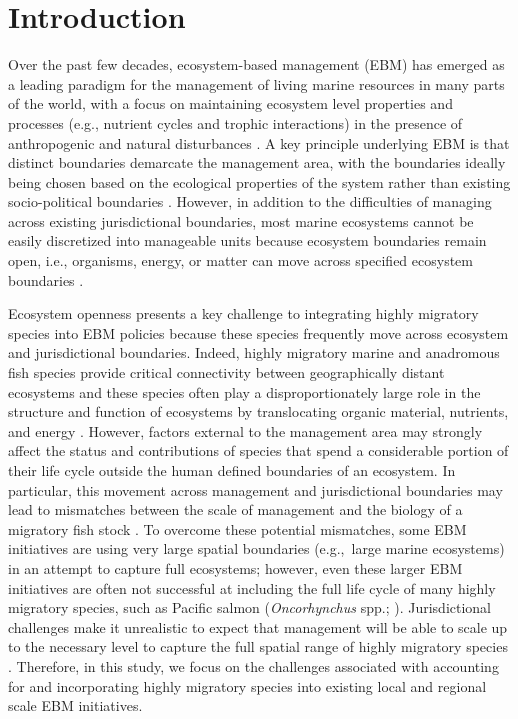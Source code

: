 \section{Introduction}

Over the past few decades, ecosystem-based management (EBM) has emerged as a
leading paradigm for the management of living marine resources in many parts of
the world, with a focus on maintaining ecosystem level properties and processes
(e.g., nutrient cycles and trophic interactions) in the presence of
anthropogenic and natural disturbances \citep{Engler2015, Skjoldal2008,
Fletcher2008, Constable2011, Olsson2008}. A key principle underlying EBM is that
distinct boundaries demarcate the management area, with the boundaries ideally
being chosen based on the ecological properties of the system rather than
existing socio-political boundaries \citep{Long2015, Engler2015}. However, in
addition to the difficulties of managing across existing jurisdictional
boundaries, most marine ecosystems cannot be easily discretized into manageable
units because ecosystem boundaries remain open, i.e., organisms, energy, or
matter can move across specified ecosystem boundaries \citep{ONeill2001}.

Ecosystem openness presents a key challenge to integrating highly migratory
species into EBM policies because these species frequently move across ecosystem
and jurisdictional boundaries. Indeed, highly migratory marine and anadromous
fish species provide critical connectivity between geographically distant
ecosystems and these species often play a disproportionately large role in the
structure and function of ecosystems by translocating organic material,
nutrients, and energy \citep{Lundberg2003, Heupel2015}. However, factors
external to the management area may strongly affect the status and contributions
of species that spend a considerable portion of their life cycle outside the
human defined boundaries of an ecosystem. In particular, this movement across
management and jurisdictional boundaries may lead to mismatches between the
scale of management and the biology of a migratory fish stock \citep{Cash2006a,
Epstein2015}. To overcome these potential mismatches, some EBM initiatives are
using very large spatial boundaries (e.g.,~large marine ecosystems) in an
attempt to capture full ecosystems; however, even these larger EBM initiatives
are often not successful at including the full life cycle of many highly
migratory species, such as Pacific salmon (\emph{Oncorhynchus} spp.;
\citealp{Field2006a, Sherman1999, Wang2004}). Jurisdictional challenges
make it unrealistic to expect that management will be able to scale up to the
necessary level to capture the full spatial range of highly migratory species
\citep{Cowan2012, Lascelles2014}. Therefore, in this study, we focus on the
challenges associated with accounting for and incorporating highly migratory
species into existing local and regional scale EBM initiatives.

